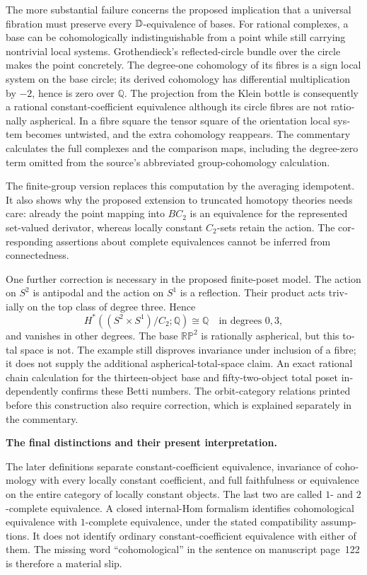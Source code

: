 \begin{otherlanguage}{english}
\begin{otherlanguage}{english}
The more substantial failure concerns the proposed implication that a universal fibration must preserve every $\mathbb{D}$-equivalence of bases. For rational complexes, a base can be cohomologically indistinguishable from a point while still carrying nontrivial local systems. Grothendieck's reflected-circle bundle over the circle makes the point concretely. The degree-one cohomology of its fibres is a sign local system on the base circle; its derived cohomology has differential multiplication by $-2$, hence is zero over $\mathbb Q$. The projection from the Klein bottle is consequently a rational constant-coefficient equivalence although its circle fibres are not rationally aspherical. In a fibre square the tensor square of the orientation local system becomes untwisted, and the extra cohomology reappears. The commentary calculates the full complexes and the comparison maps, including the degree-zero term omitted from the source's abbreviated group-cohomology calculation.

The finite-group version replaces this computation by the averaging idempotent. It also shows why the proposed extension to truncated homotopy theories needs care: already the point mapping into $BC_2$ is an equivalence for the represented set-valued derivator, whereas locally constant $C_2$-sets retain the action. The corresponding assertions about complete equivalences cannot be inferred from connectedness.

One further correction is necessary in the proposed finite-poset model. The action on $S^2$ is antipodal and the action on $S^1$ is a reflection. Their product acts trivially on the top class of degree three. Hence
\[
 H^*((S^2\times S^1)/C_2;\mathbb Q)
 \cong\mathbb Q\quad\text{in degrees }0,3,
\]
and vanishes in other degrees. The base $\mathbb{RP}^2$ is rationally aspherical, but this total space is not. The example still disproves invariance under inclusion of a fibre; it does not supply the additional aspherical-total-space claim. An exact rational chain calculation for the thirteen-object base and fifty-two-object total poset independently confirms these Betti numbers. The orbit-category relations printed before this construction also require correction, which is explained separately in the commentary.

\medskip\noindent\textbf{The final distinctions and their present interpretation.}

The later definitions separate constant-coefficient equivalence, invariance of cohomology with every locally constant coefficient, and full faithfulness or equivalence on the entire category of locally constant objects. The last two are called $1$- and $2$-complete equivalence. A closed internal-Hom formalism identifies cohomological equivalence with $1$-complete equivalence, under the stated compatibility assumptions. It does not identify ordinary constant-coefficient equivalence with either of them. The missing word ``cohomological'' in the sentence on manuscript page~122 is therefore a material slip.


\end{otherlanguage}
\end{otherlanguage}
